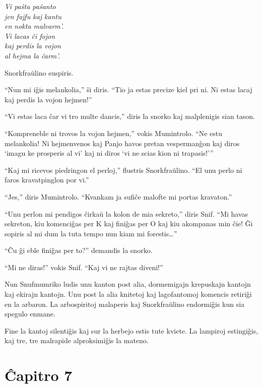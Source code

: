 \begin{center}\itshape Vi paŝta paŝanto\\
jen fajfu kaj kantu\\
en nokta malvarm'.\\
Vi lacas ĉi fojon\\
kaj perdis la vojon\\
al hejma la ĉarm'.\\\end{center}

Snorkfraŭlino suspiris.

``Nun mi iĝis melankolia,'' ŝi diris. ``Tio ja estas precize kiel pri ni. Ni estas lacaj kaj perdis la vojon hejmen!''

``Vi estas laca ĉar vi tro multe dancis,'' diris la snorko kaj malplenigis sian tason.

``Kompreneble ni trovos la vojon hejmen,'' vokis Mumintrolo. ``Ne estu melankolia! Ni hejmenvenos kaj Panjo havos pretan vespermanĝon kaj diros `imagu ke prosperis al vi' kaj ni diros `vi ne scias kion ni trapasis!'''

``Kaj mi ricevos piedringon el perloj,'' flustris Snorkfraŭlino. ``El unu perlo ni faros kravatpinglon por vi.''

``Jes,'' diris Mumintrolo. ``Kvankam ja sufiĉe malofte mi portas kravaton.''

``Unu perlon mi pendigos ĉirkaŭ la kolon de mia sekreto,'' diris Snif. ``Mi havas sekreton, kiu komenciĝas per K kaj finiĝas per O kaj kiu akompanas min ĉie! Ĝi sopiris al mi dum la tuta tempo nun kiam mi forestis{\ldots}''

``Ĉu ĝi eble finiĝas per to?'' demandis la snorko.

``Mi ne diras!'' vokis Snif. ``Kaj vi ne rajtas diveni!''

Nun Snufmumriko ludis unu kanton post alia, dormemigajn krepuskajn kantojn kaj ekirajn kantojn. Unu post la alia knitetoj kaj lagofantomoj komencis retiriĝi en la arbaron. La arbospiritoj malaperis kaj Snorkfraŭlino endormiĝis kun sia spegulo enmane.

Fine la kantoj silentiĝis kaj sur la herbejo estis tute kviete. La lampiroj estingiĝis, kaj tre, tre malrapide alproksimiĝis la mateno.

\chapter*[Ĉapitro 7]{Ĉapitro 7}


